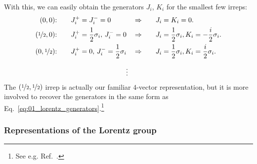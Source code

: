 With this, we can easily obtain the generators $J_i$, $K_i$ for the smallest few irreps:
\begin{align}
	\label{eq:01_lorentz_irreps_00}
	(0, 0)\text{:}& \qquad J^+_i = J^-_i = 0 \! &\Rightarrow& \qquad J_i = K_i = 0. \\
	\label{eq:01_lorentz_irreps_weyl_left}
	(\nicefrac{1}{2}, 0)\text{:}& \qquad J^+_i = \frac{1}{2} \sigma_i,\, J^-_i = 0 \! &\Rightarrow& \qquad J_i = \frac{1}{2} \sigma_i, K_i = -\frac{i}{2} \sigma_i. \\
	\label{eq:01_lorentz_irreps_weyl_right}
	(0, \nicefrac{1}{2})\text{:}& \qquad J^+_i = 0,\, J^-_i = \frac{1}{2} \sigma_i \! &\Rightarrow& \qquad J_i = \frac{1}{2} \sigma_i, K_i = \frac{i}{2} \sigma_i. \\[2mm]
	& \qquad\qquad\qquad\qquad\qquad \vdots \notag
	\vspace{-10mm}
\end{align}
The $(\nicefrac{1}{2}, \nicefrac{1}{2})$ irrep is actually our familiar $4$-vector representation, but it is more involved to recover the generators in the same form as Eq.~\ref{eq:01_lorentz_generators}.\footnote{See e.g. Ref.~\cite{439080}.}


\subsubsection{Representations of the Lorentz group}

